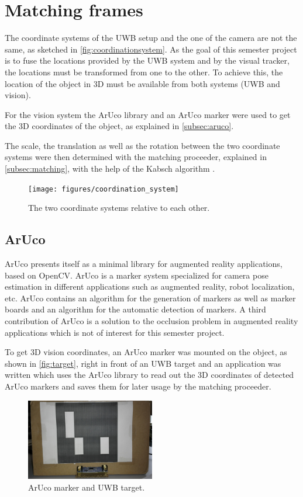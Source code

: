 \section{Matching frames}
The coordinate systems of the \ac{UWB} setup and the one of the camera are not the same, as sketched in \autoref{fig:coordinationsystem}. As the goal of this semester project is to fuse the locations provided by the \ac{UWB} system and by the visual tracker, the locations must be transformed from one to the other. To achieve this, the location of the object in 3D must be available from both systems (\ac{UWB} and vision).

For the vision system the ArUco \cite{Aruco2014} library and an ArUco marker were used to get the 3D coordinates of the object, as explained in \autoref{subsec:aruco}.

The scale, the translation as well as the rotation between the two coordinate systems were then determined with the matching proceeder, explained in \autoref{subsec:matching}, with the help of the Kabsch algorithm \cite{Kabsch:a12999}.
\begin{figure}[ht!]\centering
	\texttt{[image: figures/coordination\_system]}
	\caption{The two coordinate systems relative to each other.}\label{fig:coordinationsystem}
\end{figure}

\subsection{ArUco}\label{subsec:aruco}
ArUco \cite{Aruco2014} presents itself as a minimal library for augmented reality applications, based on OpenCV. ArUco is a marker system specialized for camera pose estimation in different applications such as augmented reality, robot localization, etc. ArUco contains an algorithm for the generation of markers as well as marker boards and an algorithm for the automatic detection of markers. A third contribution of ArUco is a solution to the occlusion problem in augmented reality applications which is not of interest for this semester project.

To get 3D vision coordinates, an ArUco marker was mounted on the object, as shown in \autoref{fig:target}, right in front of an \ac{UWB} target and an application was written which uses the ArUco library to read out the 3D coordinates of detected ArUco markers and saves them for later usage by the matching proceeder.
\begin{figure}[ht!]\centering
	\includegraphics[width=0.5\textwidth]{figures/Box_cut.jpg}
	\caption{ArUco marker and \ac{UWB} target.}\label{fig:target}
\end{figure}

